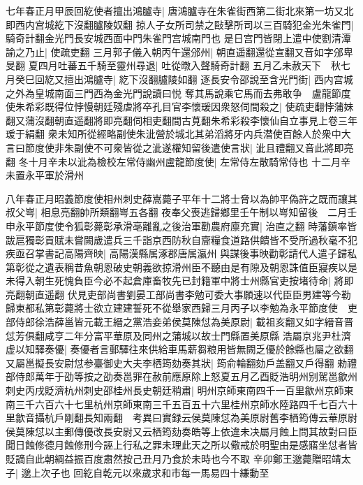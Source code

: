 七年春正月甲辰回紇使者擅出鴻臚寺|{
	唐鴻臚寺在朱雀街西第二街北來第一坊又北即西内宫城紇下沒翻臚陵奴翻}
掠人子女所司禁之敺擊所司以三百騎犯金光朱雀門|{
	騎奇計翻金光門長安城西面中門朱雀門宫城南門也}
是日宫門皆閉上遣中使劉清潭諭之乃止|{
	使疏吏翻}
三月郭子儀入朝丙午還邠州|{
	朝直遥翻還從宣翻又音如字邠卑旻翻}
夏四月吐蕃五千騎至靈州尋退|{
	吐從暾入聲騎奇計翻}
五月乙未赦天下　秋七月癸巳回紇又擅出鴻臚寺|{
	紇下沒翻臚陵如翻}
逐長安令邵說至含光門街|{
	西内宫城之外為皇城南面三門西為金光門說讀曰悦}
奪其馬說乘它馬而去弗敢争　盧龍節度使朱希彩既得位悖慢朝廷殘虐將卒孔目官李懷瑗因衆怒伺間殺之|{
	使疏吏翻悖蒲妹翻又蒲沒翻朝直遥翻將即亮翻伺相吏翻間古莧翻朱希彩殺李懷仙自立事見上卷三年瑗于絹翻}
衆未知所從經略副使朱泚營於城北其弟滔將牙内兵潜使百餘人於衆中大言曰節度使非朱副使不可衆皆從之泚遂權知留後遣使言狀|{
	泚且禮翻又音此將即亮翻}
冬十月辛未以泚為檢校左常侍幽州盧龍節度使|{
	左常侍左散騎常侍也}
十二月辛未置永平軍於滑州

八年春正月昭義節度使相州刺史薛嵩薨子平年十二將士脅以為帥平偽許之既而讓其叔父㟧|{
	相息亮翻帥所類翻㟧五各翻}
夜奉父喪逃歸鄉里壬午制以㟧知留後　二月壬申永平節度使令狐彰薨彰承滑亳離亂之後治軍勸農府廪充實|{
	治直之翻}
時藩鎮率皆跋扈獨彰貢賦未嘗闕歲遣兵三千詣京西防秋自齎糧食道路供饋皆不受所過秋毫不犯疾亟召掌書記高陽齊映|{
	高陽漢縣属涿郡唐属瀛州}
與謀後事映勸彰請代人遣子歸私第彰從之遺表稱昔魚朝恩破史朝義欲掠滑州臣不聽由是有隙及朝恩誅值臣寢疾以是未得入朝生死愧負臣今必不起倉庫畜牧先已封籍軍中將士州縣官吏按堵待命|{
	將即亮翻朝直遥翻}
伏見吏部尚書劉晏工部尚書李勉可委大事願速以代臣臣男建等今勒歸東都私第彰薨將士欲立建建誓死不從舉家西歸三月丙子以李勉為永平節度使　吏部侍郎徐浩薛邕皆元載王縉之黨浩妾弟侯莫陳怤為美原尉|{
	載祖亥翻又如字縉音晋怤芳俱翻咸亨二年分富平華原及同州之蒲城以故士門縣置美原縣}
浩屬京兆尹杜濟虚以知驛奏優|{
	奏優者言郵驛往來供給車馬薪芻粮用皆無闕乏優於餘縣也屬之欲翻}
又屬邕擬長安尉怤参臺御史大夫李栖筠劾奏其狀|{
	筠俞輪翻劾戶盖翻又戶得翻}
勑禮部侍郎萬年于劭等按之劭奏邕罪在赦前應原除上怒夏五月乙酉貶浩明州别駕邕歙州刺史丙戌貶濟杭州刺史邵桂州長史朝廷稍肅|{
	明州京師東南四千一百里歙州京師東南三千六百六十七里杭州京師東南三千五百五十六里桂州京師水陸路四千七百六十里歙音攝杭戶剛翻長知兩翻　考異曰實録云侯莫陳怤為美原尉舊李栖筠傳云華原尉侯莫陳怤以主郵傳優改長安尉又云栖筠劾奏皓等上依違未决屬月蝕上問其故對曰臣聞日蝕修德月蝕修刑今誣上行私之罪未理此天之所以儆戒於明聖由是感寤坐怤者皆貶謫自此朝綱益振百度肅然按己丑月乃食於未時也今不取}
辛卯鄭王邈薨贈昭靖太子|{
	邈上次子也}
回紇自乾元以來歲求和市每一馬易四十縑動至

